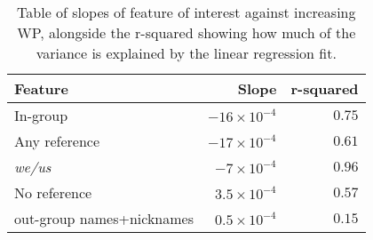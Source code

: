 \begin{table}[t]
    \centering
    \begin{tabular}{lrr}
        \toprule
        \textbf{Feature} & \textbf{Slope} & \textbf{r-squared} \\ \midrule
        In-group & $-16\times 10^{-4}$ & $0.75$ \\ \midrule
        Any reference & $-17\times 10^{-4}$ & $0.61$ \\ \midrule
        \emph{we/us} & $-7\times 10^{-4}$ & $0.96$ \\ \midrule
        No reference & $3.5\times 10^{-4}$ & $0.57$ \\ \midrule
        out-group names+nicknames & $0.5\times 10^{-4}$ & $0.15$ \\\bottomrule
    \end{tabular}
    \caption{Table of slopes of feature of interest against increasing WP, alongside the r-squared showing how much of the variance is explained by the linear regression fit.}
    \label{tab:slopes}
\end{table}
